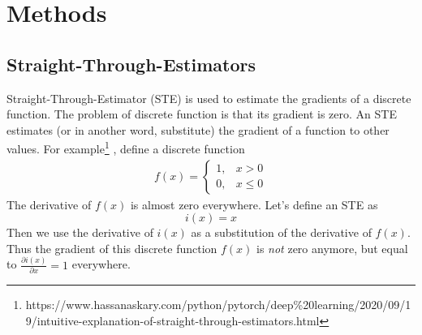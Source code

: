 \chapter{Methods}

\section{Straight-Through-Estimators}
Straight-Through-Estimator (STE)\cite{STE} is used to estimate the gradients of a discrete function. The problem of discrete function is that its gradient is zero.
An STE estimates (or in another word, substitute)  the gradient of a function to other values. For example\footnote{https://www.hassanaskary.com/python/pytorch/deep\%20learning/2020/09/19/intuitive-explanation-of-straight-through-estimators.html}
, define a discrete function 
\begin{equation}
	\begin{split}
		f(x) = \begin{cases}
			1, & x > 0\\
			0, & x\le 0
		\end{cases}
	\end{split}
\end{equation}
The derivative of $ f(x) $ is almost zero everywhere. Let's define an STE as
\[ i(x) = x \]
Then we use the derivative of $ i(x) $ as a substitution of the derivative of $ f(x) $. Thus the gradient of this discrete function $ f(x) $ is \textit{not} zero anymore, but equal to $ \frac{\partial i(x)}{\partial x} = 1 $ everywhere. 


